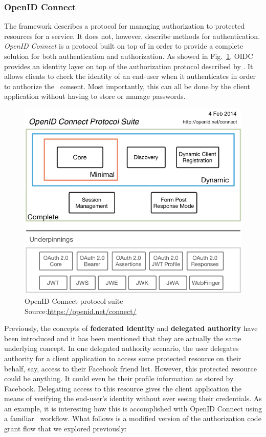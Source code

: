 \subsubsection{OpenID Connect}
The framework describes a protocol for managing authorization to protected resources for a service. It does not, however, describe methods for authentication. \textit{OpenID Connect} \cite{openid} is a protocol built on top of \textit{\oauth} in order to provide a complete solution for both authentication and authorization. As showed in Fig.~\ref{fig:oidc}, OIDC provides an identity layer on top of the authorization protocol described by \oauth. It allows clients to check the identity of an end-user when it authenticates in order to  authorize the \oauth\ consent. Most importantly, this can all be done by the client application without having to store or manage passwords.

\begin{figure}
    \centering
    \includegraphics[scale=2.0]{chapters/images/chp3/OpenIDC-map.png}
    \caption[OpenID Connect protocol suite]{OpenID Connect protocol suite\\\hspace{\textwidth}Source:\hspace{0.2cm}\url{https://openid.net/connect/}}
    \label{fig:oidc}
\end{figure}

Previously, the concepts of \textbf{federated identity} and \textbf{delegated authority} have been introduced and it has been mentioned that they are actually the same underlying concept. In one delegated authority scenario, the user delegates authority for a client application to access some protected resource on their behalf, say, access to their Facebook friend list. However, this protected resource could be anything. It could even be their profile information as stored by Facebook. Delegating access to this resource gives the client application the means of verifying the end-user's identity without ever seeing their credentials. As an example, it is interesting how this is accomplished with OpenID Connect using a familiar \oauth\ workflow. What follows is a modified version of the authorization code grant flow that we explored previously:

